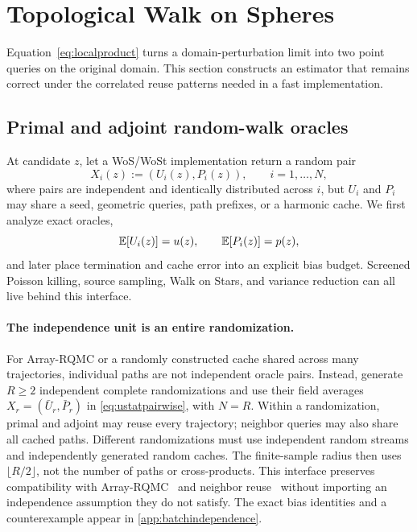 \section{Topological Walk on Spheres}
\label{sec:method}

Equation~\eqref{eq:localproduct} turns a domain-perturbation limit into two point queries on the original domain.  This section constructs an estimator that remains correct under the correlated reuse patterns needed in a fast implementation.

\subsection{Primal and adjoint random-walk oracles}

At candidate $z$, let a WoS/WoSt implementation return a random pair
\begin{equation}
  X_i(z):=(U_i(z),P_i(z)), \qquad i=1,\dots,N,
\end{equation}
where pairs are independent and identically distributed across $i$, but $U_i$ and $P_i$ may share a seed, geometric queries, path prefixes, or a harmonic cache.  We first analyze exact oracles,
\begin{equation}
  \mathbb{E}[U_i(z)]=u(z),\qquad \mathbb{E}[P_i(z)]=p(z),
  \label{eq:oraclemeans}
\end{equation}
and later place termination and cache error into an explicit bias budget.  Screened Poisson killing, source sampling, Walk on Stars, and variance reduction can all live behind this interface.

\paragraph{The independence unit is an entire randomization.}
For Array-RQMC or a randomly constructed cache shared across many trajectories,
individual paths are not independent oracle pairs.  Instead, generate $R\ge2$
independent complete randomizations and use their field averages
$X_r=(\bar U_r,\bar P_r)$ in \cref{eq:ustatpairwise}, with $N=R$.
Within a randomization, primal and adjoint may reuse every trajectory; neighbor
queries may also share all cached paths.  Different randomizations must use
independent random streams and independently generated random caches.
The finite-sample radius then uses $\lfloor R/2\rfloor$, not the number of
paths or cross-products.  This interface preserves compatibility with
Array-RQMC~\cite{ho2026array} and neighbor reuse~\cite{czekanski2026neighbors}
without importing an independence assumption they do not satisfy.
The exact bias identities and a counterexample appear in
\cref{app:batchindependence}.

